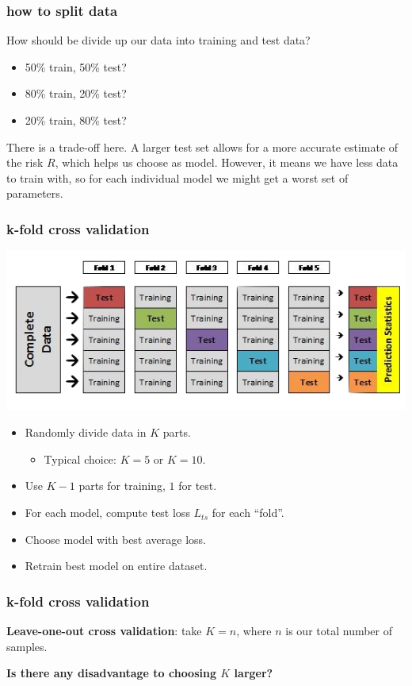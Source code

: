 \documentclass[handout,compress]{beamer}
\begin{document}
\begin{frame}
	\frametitle{how to split data}	
	How should  be divide up our data into training and test data?
	\begin{itemize}
		\item 50\% train, 50\% test?
		\item 80\% train, 20\% test?
		\item 20\% train, 80\% test?
	\end{itemize}
	There is a trade-off here. A larger test set allows for a more accurate estimate of the risk $R$, which helps us choose as model. However, it means we have less data to train with, so for each individual model we might get a worst set of parameters.
\end{frame}

\begin{frame}
	\frametitle{k-fold cross validation}
	\begin{center}
		\includegraphics[width=.7\textwidth]{crossval.png}
	\end{center}
	\begin{itemize}
		\item Randomly divide data in $K$ parts. 
		\begin{itemize}
			\item Typical choice: $K = 5$ or $K = 10$.
		\end{itemize}
		\item Use $K-1$ parts for training, $1$ for test.
		\item For each model, compute test loss $L_{ts}$ for each ``fold''.
		\item Choose model with best average loss. 
		\item Retrain best model on entire dataset.
	\end{itemize}
\end{frame}

\begin{frame}
	\frametitle{k-fold cross validation}
	\textbf{Leave-one-out cross validation}: take $K = n$, where $n$ is our total number of samples. 
	
	\begin{center}
		\alert{\textbf{Is there any disadvantage to choosing $K$ larger?}}
	\end{center}
	
\end{frame}
\end{document}
